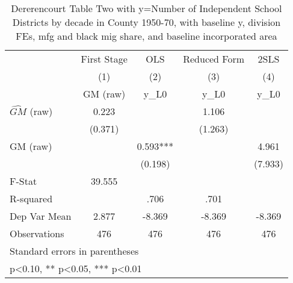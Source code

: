 \begin{table}[htbp]\centering
\def\sym#1{\ifmmode^{#1}\else\(^{#1}\)\fi}
\caption{Dererencourt Table Two with y=Number of Independent School Districts by decade in County 1950-70, with baseline y, division FEs, mfg and black mig share, and baseline incorporated area}
\begin{tabular}{l*{4}{c}}
\toprule
                    & First Stage   &         OLS   &Reduced Form   &        2SLS   \\
                    &\multicolumn{1}{c}{(1)}&\multicolumn{1}{c}{(2)}&\multicolumn{1}{c}{(3)}&\multicolumn{1}{c}{(4)}\\
                    &\multicolumn{1}{c}{GM  (raw)}&\multicolumn{1}{c}{y\_L0}&\multicolumn{1}{c}{y\_L0}&\multicolumn{1}{c}{y\_L0}\\
\midrule
$\hat{GM}$ (raw)    &       0.223   &               &       1.106   &               \\
                    &     (0.371)   &               &     (1.263)   &               \\
\addlinespace
GM  (raw)           &               &       0.593***&               &       4.961   \\
                    &               &     (0.198)   &               &     (7.933)   \\
\midrule
F-Stat              &      39.555   &               &               &               \\
R-squared           &               &        .706   &        .701   &               \\
Dep Var Mean        &       2.877   &      -8.369   &      -8.369   &      -8.369   \\
Observations        &         476   &         476   &         476   &         476   \\
\bottomrule
\multicolumn{5}{l}{\footnotesize Standard errors in parentheses}\\
\multicolumn{5}{l}{\footnotesize * p<0.10, ** p<0.05, *** p<0.01}\\
\end{tabular}
\end{table}
